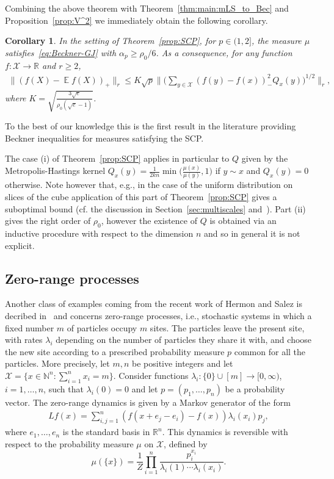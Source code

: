 \documentclass[a4paper]{amsart}
\newtheorem{corollary}[theorem]{Corollary} %
\theoremstyle{definition}
\theoremstyle{remark}
\numberwithin{equation}{section}
\newcommand*{\RR}{\mathbb{R}}
\newcommand*{\NN}{\mathbb{N}}
\newcommand{\calX}{\mathcal{X}}
\DeclareMathOperator{\EE}{\mathbb{E}} %
\begin{document}
Combining the above theorem with Theorem~\ref{thm:main:mLS_to_Bec} and Proposition~\ref{prop:V^2} we immediately obtain the following corollary.
\begin{corollary}\label{cor:SCP}
In the setting of Theorem~\ref{prop:SCP}, for $p \in (1,2]$, the measure $\mu$ satisfies~\eqref{eq:Beckner-GJ} with $\alpha_p \ge \rho_0/6$. As a consequence, for any function $f\colon \calX \to \RR$ and $r \ge 2$,
\begin{align}
  \|(f(X) - \EE f(X))_+\|_r \le K\sqrt{p}\Big\|\Big(\sum_{y\in \calX} (f(y)-f(x))_-^2 Q_x(y)\Big)^{1/2}\Big\|_r,
\end{align}
where $K=\sqrt{\frac{3\sqrt{e}}{\rho_0(\sqrt{e}-1)}}$.
\end{corollary}

To the best of our knowledge this is the first result in the literature providing Beckner inequalities for measures satisfying the SCP.

The case (i) of Theorem~\ref{prop:SCP} applies in particular to $Q$ given by the Metropolis-Hastings kernel $Q_x(y) = \frac{1}{2kn}\min\Big(\frac{\mu(x)}{\mu(y)},1\Big)$ if $y \sim x$ and $Q_x(y) = 0$ otherwise. Note however that, e.g., in the case of the uniform distribution on slices of the cube application of this part of Theorem~\ref{prop:SCP} gives a suboptimal bound (cf. the discussion in Section~\ref{sec:multiscales} and~\cite{MR2283379,MR2023890}). Part (ii) gives the right order of $\rho_0$, however the existence of $Q$ is obtained via an inductive procedure with respect to the dimension $n$ and so in general it is not explicit.


\subsection{Zero-range processes}

Another class of examples coming from the recent work of Hermon and Salez is decribed in~\cite{hermon2019entropy} and concerns zero-range processes, i.e., stochastic systems in which a fixed number $m$ of particles occupy $m$ sites. The particles leave the present site, with rates $\lambda_i$ depending on the number of particles they share it with, and choose the new site according to a prescribed probability measure $p$ common for all the particles. More precisely, let $m, n$ be positive integers and let $\mathcal{X} = \{x\in \NN^n\colon \sum_{i=1}^n x_i = m\}$. Consider functions $\lambda_i \colon \{0\}\cup[m] \to [0,\infty)$, $i=1,\ldots,n$, such that $\lambda_i(0) = 0$  and let $p = (p_1,\ldots,p_n)$ be a probability vector. The zero-range dynamics is given by a Markov generator of the form
\begin{align}\label{eq:L-zero-range}
  Lf(x) = \sum_{i,j=1}^n (f(x+ e_j-e_i) - f(x)) \lambda_i(x_i)p_j,
\end{align}
where $e_1,\ldots,e_n$ is the standard basis in $\RR^n$.
This dynamics is reversible with respect to the probability measure $\mu$ on $\calX$, defined by
\begin{equation}\label{eq:mu-0-range}
  \mu(\{x\}) = \frac{1}{Z}\prod_{i=1}^n\frac{p_i^{x_i}}{\lambda_i(1)\cdots \lambda_i(x_i)}.
\end{equation}
\end{document}
